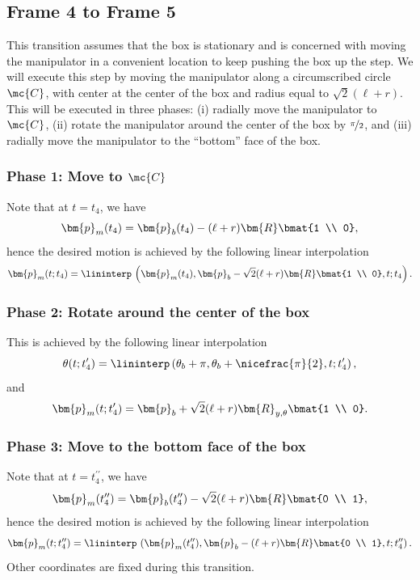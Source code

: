 \subsection{Frame 4 to Frame 5}
\label{sec:frame4to5}
%
This transition assumes that the box is stationary and is concerned with moving 
the manipulator in a convenient location to keep pushing the box up the step. 
We will execute this step by moving the manipulator along a circumscribed
circle $\mc{C}$, with center at the center of the box and radius equal to
$\sqrt{2}(\ell + r)$.  This will be executed in three phases: (i) radially move
the manipulator to $\mc{C}$, (ii) rotate the manipulator around the center of
the box by $\nicefrac{\pi}{2}$, and (iii) radially move the manipulator to the
``bottom'' face of the box.

\subsubsection{Phase 1: Move to $\mc{C}$}
%
Note that at $t = t_4$, we have 
\[ \bm{p}_m(t_4) = \bm{p}_b(t_4) - (\ell+r)\bm{R}\bmat{1 \\ 0}, \] hence
the desired motion is achieved by the following linear interpolation
\[
\bm{p}_m(t; t_4) = \lininterp\,\left(\bm{p}_m(t_4), \bm{p}_b - \sqrt{2}(\ell +
r)\bm{R}\bmat{1 \\ 0}, t; t_4\right).  
\]

\subsubsection{Phase 2: Rotate around the center of the box}
%
This is achieved by the following linear interpolation
\[
\theta(t; t_4^{\prime}) = \lininterp\left(\theta_b+\pi,
\theta_b+\nicefrac{\pi}{2}, t; t_4^\prime \right),
\]
%
and
\[
\bm{p}_m(t; t_4^{\prime}) = \bm{p}_b + \sqrt{2}(\ell +
r)\bm{R}_{y,\theta}\bmat{1 \\ 0}.
\]

\subsubsection{Phase 3: Move to the bottom face of the box}
%
Note that at $t = t_4^{\prime\prime}$, we have 
\[ \bm{p}_m(t_4^{\prime\prime}) = \bm{p}_b(t_4^{\prime\prime}) -
\sqrt{2}(\ell+r)\bm{R}\bmat{0 \\ 1}, \] hence the desired motion is
achieved by the following linear interpolation
\[ 
\bm{p}_m(t; t_4^{\prime\prime}) =
\lininterp\,\left(\bm{p}_m(t_4^{\prime\prime}), \bm{p}_b - (\ell+r)\bm{R}\bmat{0
\\ 1}, t; t_4^{\prime\prime}\right).
\]
%
Other coordinates are fixed during this transition. 

